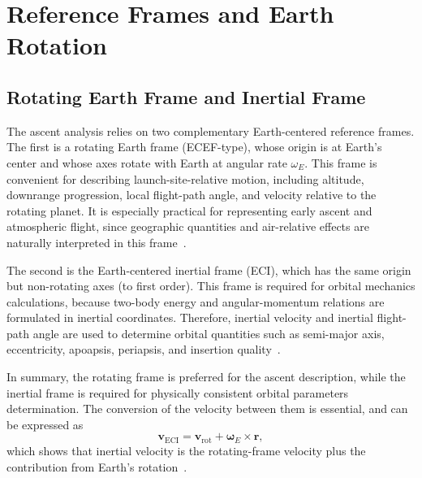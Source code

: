 
\section{Reference Frames and Earth Rotation}
\label{sec:reference_frames}

\subsection{Rotating Earth Frame and Inertial Frame}
\label{ssec:frames}

The ascent analysis relies on two complementary Earth-centered reference frames.
The first is a rotating Earth frame (ECEF-type), whose origin is at Earth’s center and whose axes rotate with Earth at angular rate $\omega_E$. This frame is convenient for describing launch-site-relative motion, including altitude, downrange progression, local flight-path angle, and velocity relative to the rotating planet. It is especially practical for representing early ascent and atmospheric flight, since geographic quantities and air-relative effects are naturally interpreted in this frame~\cite{relativityframes}.

The second is the Earth-centered inertial frame (ECI), which has the same origin but non-rotating axes (to first order). This frame is required for orbital mechanics calculations, because two-body energy and angular-momentum relations are formulated in inertial coordinates. Therefore, inertial velocity and inertial flight-path angle are used to determine orbital quantities such as semi-major axis, eccentricity, apoapsis, periapsis, and insertion quality~\cite{relativityframes}.

In summary, the rotating frame is preferred for the ascent description, while the inertial frame is required for physically consistent orbital parameters determination. The conversion of the velocity between them is essential, and can be expressed as
\[
\mathbf{v}_{\mathrm{ECI}}=\mathbf{v}_{\mathrm{rot}}+\boldsymbol{\omega}_E\times\mathbf{r},
\]
which shows that inertial velocity is the rotating-frame velocity plus the contribution from Earth’s rotation~\cite{relativityframes}.


